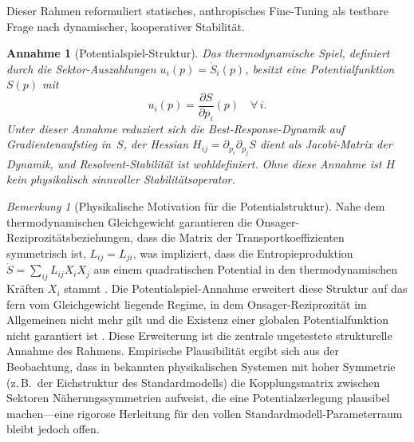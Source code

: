 \documentclass[12pt,a4paper]{article}
\newtheorem{assumption}{Annahme}
\theoremstyle{remark}
\newtheorem{remark}{Bemerkung}
\begin{document}
Dieser Rahmen reformuliert statisches, anthropisches Fine-Tuning als testbare Frage nach dynamischer, kooperativer Stabilit\"at.

\begin{assumption}[Potentialspiel-Struktur]\label{ass:potential-game}
Das thermodynamische Spiel, definiert durch die Sektor-Auszahlungen $u_i(p) = \dot{S}_i(p)$, besitzt eine \emph{Potentialfunktion} $S(p)$ mit
\[
  u_i(p) = \frac{\partial S}{\partial p_i}(p) \quad \forall\, i.
\]
Unter dieser Annahme reduziert sich die Best-Response-Dynamik auf Gradientenaufstieg in~$S$, der Hessian $H_{ij} = \partial_{p_i}\partial_{p_j} S$ dient als Jacobi-Matrix der Dynamik, und Resolvent-Stabilit\"at ist wohldefiniert. Ohne diese Annahme ist $H$ kein physikalisch sinnvoller Stabilit\"atsoperator.
\end{assumption}

\begin{remark}[Physikalische Motivation f\"ur die Potentialstruktur]
\label{rem:potential-motivation}
Nahe dem thermodynamischen Gleichgewicht garantieren die Onsager-Reziprozit\"atsbeziehungen, dass die Matrix der Transportkoeffizienten symmetrisch ist, $L_{ij} = L_{ji}$, was impliziert, dass die Entropieproduktion $\dot{S} = \sum_{ij} L_{ij} X_i X_j$ aus einem quadratischen Potential in den thermodynamischen Kr\"aften $X_i$ stammt \citep{Prigogine1967}. Die Potentialspiel-Annahme erweitert diese Struktur auf das fern vom Gleichgewicht liegende Regime, in dem Onsager-Reziprozit\"at im Allgemeinen nicht mehr gilt und die Existenz einer globalen Potentialfunktion nicht garantiert ist \citep{GrinsteinLinsker2007}. Diese Erweiterung ist die zentrale ungetestete strukturelle Annahme des Rahmens. Empirische Plausibilit\"at ergibt sich aus der Beobachtung, dass in bekannten physikalischen Systemen mit hoher Symmetrie (z.\,B.\ der Eichstruktur des Standardmodells) die Kopplungsmatrix zwischen Sektoren N\"aherungssymmetrien aufweist, die eine Potentialzerlegung plausibel machen---eine rigorose Herleitung f\"ur den vollen Standardmodell-Parameterraum bleibt jedoch offen.
\end{remark}
\end{document}
